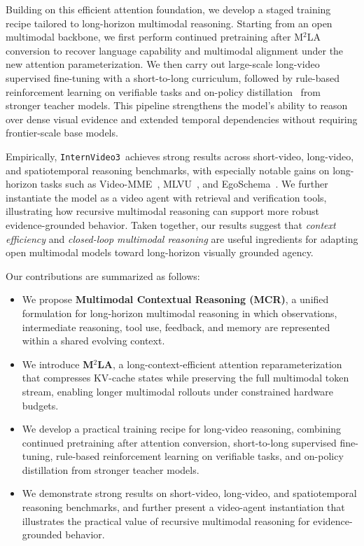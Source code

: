 \documentclass[11pt, letterpaper]{template}
\theoremstyle{plain}
\theoremstyle{definition}
\theoremstyle{remark}
\newcommand{\name}{\texttt{InternVideo3}\xspace}
\begin{document}
Building on this efficient attention foundation, we develop a staged training recipe tailored to long-horizon multimodal reasoning. Starting from an open multimodal backbone, we first perform continued pretraining after M$^2$LA conversion to recover language capability and multimodal alignment under the new attention parameterization. We then carry out large-scale long-video supervised fine-tuning with a short-to-long curriculum, followed by rule-based reinforcement learning on verifiable tasks and on-policy distillation~\citep{agarwal2024policy,lu2025onpolicydistillation,xu2025speculative} from stronger teacher models. This pipeline strengthens the model's ability to reason over dense visual evidence and extended temporal dependencies without requiring frontier-scale base models.

Empirically, \name\ achieves strong results across short-video, long-video, and spatiotemporal reasoning benchmarks, with especially notable gains on long-horizon tasks such as Video-MME~\citep{videomme}, MLVU~\citep{mlvu}, and EgoSchema~\citep{egoschema}. We further instantiate the model as a video agent with retrieval and verification tools, illustrating how recursive multimodal reasoning can support more robust evidence-grounded behavior. Taken together, our results suggest that \emph{context efficiency} and \emph{closed-loop multimodal reasoning} are useful ingredients for adapting open multimodal models toward long-horizon visually grounded agency.

Our contributions are summarized as follows:
\begin{itemize}[leftmargin=*]
    \item We propose \textbf{Multimodal Contextual Reasoning (MCR)}, a unified formulation for long-horizon multimodal reasoning in which observations, intermediate reasoning, tool use, feedback, and memory are represented within a shared evolving context.
    \item We introduce \textbf{M$^2$LA}, a long-context-efficient attention reparameterization that compresses KV-cache states while preserving the full multimodal token stream, enabling longer multimodal rollouts under constrained hardware budgets.
    \item We develop a practical training recipe for long-video reasoning, combining continued pretraining after attention conversion, short-to-long supervised fine-tuning, rule-based reinforcement learning on verifiable tasks, and on-policy distillation from stronger teacher models.
    \item We demonstrate strong results on short-video, long-video, and spatiotemporal reasoning benchmarks, and further present a video-agent instantiation that illustrates the practical value of recursive multimodal reasoning for evidence-grounded behavior.
\end{itemize}
\end{document}
